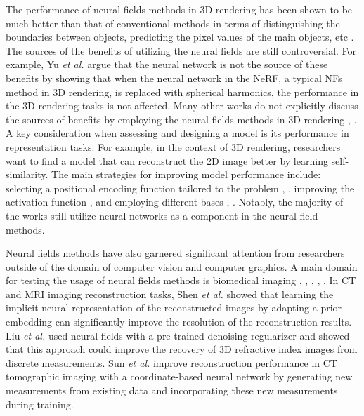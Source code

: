 \documentclass[lettersize,journal]{IEEEtran}
\begin{document}
The performance of neural fields methods in 3D rendering has been shown to be much better than that of conventional methods in terms of distinguishing the boundaries between objects, predicting the pixel values of the main objects, etc \cite{10.1145/3503250}. The sources of the benefits of utilizing the neural fields are still controversial. For example, Yu \textit{et al.} \cite{yu_plenoxels_2021} argue that the neural network is not the source of these benefits by showing that when the neural network in the NeRF, a typical NFs method in 3D rendering, is replaced with spherical harmonics, the performance in the 3D rendering tasks is not affected. Many other works do not explicitly discuss the sources of benefits by employing the neural fields methods in 3D rendering \cite{10.1145/3503250}, \cite{martinbrualla2021nerfwildneuralradiance}. A key consideration when assessing and designing a model is its performance in representation tasks. For example, in the context of 3D rendering, researchers want to find a model that can reconstruct the 2D image better by learning self-similarity. The main strategies for improving model performance include: selecting a positional encoding function tailored to the problem \cite{tancik2020fourierfeaturesletnetworks}, \cite{DBLP}, improving the activation function \cite{sitzmann2020implicitneuralrepresentationsperiodic}, and employing different bases \cite{fathony2021multiplicative}, \cite{yu_plenoxels_2021}. Notably, the majority of the works still utilize neural networks as a component in the neural field methods.

Neural fields methods have also garnered significant attention from researchers outside of the domain of computer vision and computer graphics. A main domain for testing the usage of neural fields methods is biomedical imaging \cite{arratia2024enhancingdynamicctimage}, \cite{molaei2023implicitneuralrepresentationmedical}, \cite{9606601}, \cite{shen_nerp_2024}, \cite{liu2022recoverycontinuous3drefractive}. In CT and MRI imaging reconstruction tasks, Shen \textit{et al.} \cite{shen_nerp_2024} showed that learning the implicit neural representation of the reconstructed images by adapting a prior embedding can significantly improve the resolution of the reconstruction results. Liu \textit{et al.} \cite{liu2022recoverycontinuous3drefractive} used neural fields with a pre-trained denoising regularizer and showed that this approach could improve the recovery of 3D refractive index images from discrete measurements.  
Sun \textit{et al.} \cite{9606601} improve reconstruction performance in CT tomographic imaging with a coordinate-based neural network by generating new measurements from existing data and incorporating these new measurements during training. 
\end{document}
